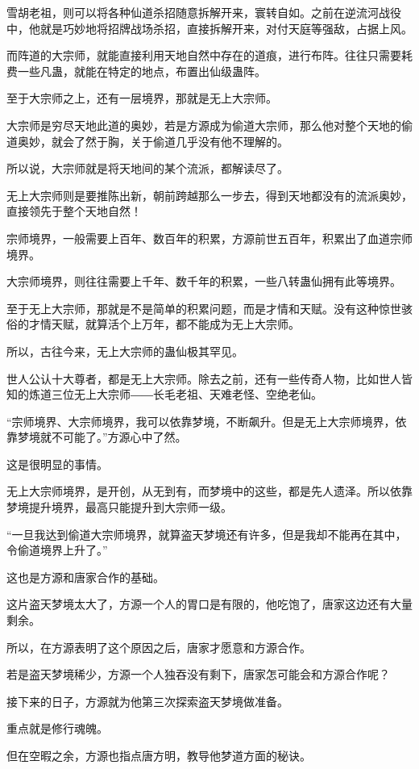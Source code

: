 \begin{this_body}
雪胡老祖，则可以将各种仙道杀招随意拆解开来，寰转自如。之前在逆流河战役中，他就是巧妙地将招牌战场杀招，直接拆解开来，对付天庭等强敌，占据上风。

而阵道的大宗师，就能直接利用天地自然中存在的道痕，进行布阵。往往只需要耗费一些凡蛊，就能在特定的地点，布置出仙级蛊阵。

至于大宗师之上，还有一层境界，那就是无上大宗师。

大宗师是穷尽天地此道的奥妙，若是方源成为偷道大宗师，那么他对整个天地的偷道奥妙，就会了然于胸，关于偷道几乎没有他不理解的。

所以说，大宗师就是将天地间的某个流派，都解读尽了。

无上大宗师则是要推陈出新，朝前跨越那么一步去，得到天地都没有的流派奥妙，直接领先于整个天地自然！

宗师境界，一般需要上百年、数百年的积累，方源前世五百年，积累出了血道宗师境界。

大宗师境界，则往往需要上千年、数千年的积累，一些八转蛊仙拥有此等境界。

至于无上大宗师，那就是不是简单的积累问题，而是才情和天赋。没有这种惊世骇俗的才情天赋，就算活个上万年，都不能成为无上大宗师。

所以，古往今来，无上大宗师的蛊仙极其罕见。

世人公认十大尊者，都是无上大宗师。除去之前，还有一些传奇人物，比如世人皆知的炼道三位无上大宗师――长毛老祖、天难老怪、空绝老仙。

“宗师境界、大宗师境界，我可以依靠梦境，不断飙升。但是无上大宗师境界，依靠梦境就不可能了。”方源心中了然。

这是很明显的事情。

无上大宗师境界，是开创，从无到有，而梦境中的这些，都是先人遗泽。所以依靠梦境提升境界，最高只能提升到大宗师一级。

“一旦我达到偷道大宗师境界，就算盗天梦境还有许多，但是我却不能再在其中，令偷道境界上升了。”

这也是方源和唐家合作的基础。

这片盗天梦境太大了，方源一个人的胃口是有限的，他吃饱了，唐家这边还有大量剩余。

所以，在方源表明了这个原因之后，唐家才愿意和方源合作。

若是盗天梦境稀少，方源一个人独吞没有剩下，唐家怎可能会和方源合作呢？

接下来的日子，方源就为他第三次探索盗天梦境做准备。

重点就是修行魂魄。

但在空暇之余，方源也指点唐方明，教导他梦道方面的秘诀。


\end{this_body}
